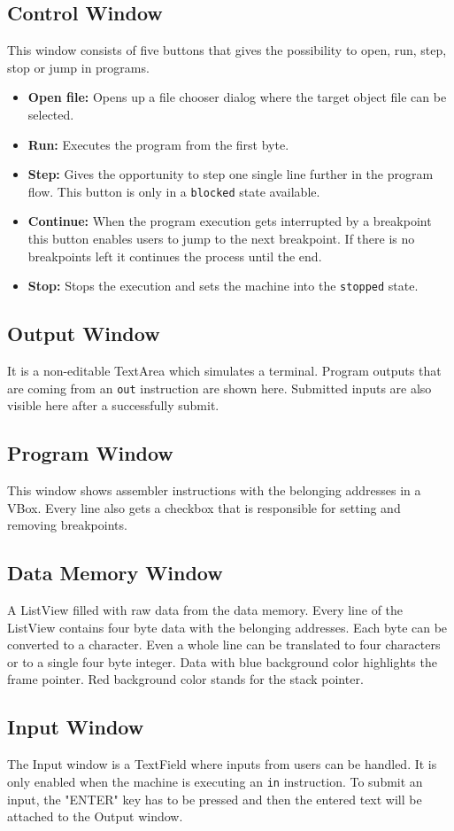 \subsection{Control Window}
This window consists of five buttons that gives the possibility to open, run, step, stop or jump in programs. 
\begin{itemize}
\item \textbf{Open file: }Opens up a file chooser dialog where the target object file can be selected.
\item \textbf{Run: }Executes the program from the first byte.
\item \textbf{Step: }Gives the opportunity to step one single line further in the program flow. This button is only in a \lstinline$blocked$ state available.
\item \textbf{Continue: }When the program execution gets interrupted by a breakpoint this button enables users to jump to the next breakpoint. If there is no breakpoints left it continues the process until the end.
\item \textbf{Stop: }Stops the execution and sets the machine into the \lstinline$stopped$ state.
\end{itemize}
\subsection{Output Window}
It is a non-editable TextArea which simulates a terminal. Program outputs that are coming from an \lstinline$out$ instruction are shown here. Submitted inputs are also visible here after a successfully submit.
\subsection{Program Window}
This window shows assembler instructions with the belonging addresses in a VBox. Every line also gets a checkbox that is responsible for setting and removing breakpoints.
\subsection{Data Memory Window}
A ListView filled with raw data from the data memory. Every line of the ListView contains four byte data with the belonging addresses. Each byte can be converted to a character. Even a whole line can be translated to four characters or to a single four byte integer. Data with blue background color highlights the frame pointer. Red background color stands for the stack pointer.
\subsection{Input Window}
The Input window is a TextField where inputs from users can be handled. It is only enabled when the machine is executing an \lstinline$in$ instruction. To submit an input, the "ENTER" key has to be pressed and then the entered text will be attached to the Output window.

